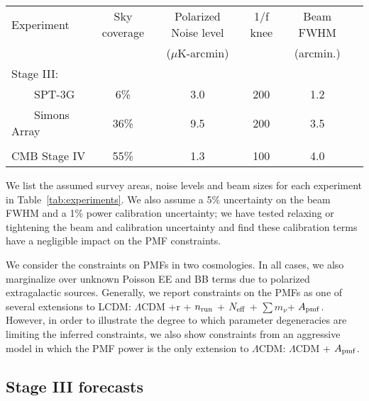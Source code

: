 \documentclass[preprint]{emulateapj}
\newcommand{\apmf}{\ensuremath{A_{\rm pmf}}}
\newcommand{\lcdm}{\ensuremath{\Lambda}CDM}
\newcommand{\nrun}{\ensuremath{n_{\rm run}}}
\newcommand{\neff}{\ensuremath{N_{\rm eff}}}
\newcommand{\mnu}{\ensuremath{\sum m_\nu}}
\begin{document}
\begin{table*}[h]
\begin{center}
\caption{\label{tab:experiments} Assumed survey parameters}
\small
\begin{tabular}{l || c c c c c }
Experiment & Sky coverage & Polarized Noise level  & 1/f knee & Beam FWHM \\
& &($\mu$K-arcmin)&&(arcmin.)\\
\hline
Stage III: & & & & \\

~~~~SPT-3G & 6\% & 3.0 & 200 & 1.2 \\
~~~~Simons Array & 36\% & 9.5 & 200 & 3.5 \\ 
\\
CMB Stage IV & 55\% & 1.3 & 100 & 4.0 \\
\end{tabular}
 \normalsize
\end{center}
\end{table*}


We list the assumed survey areas, noise levels and beam sizes for each experiment in Table~\ref{tab:experiments}. 
We also assume a 5\% uncertainty on the beam FWHM and a 1\% power calibration uncertainty; we have tested relaxing or tightening the beam and calibration uncertainty and find these calibration terms have a negligible impact on the PMF constraints. 


We consider the constraints on PMFs in two cosmologies. 
In all cases, we also marginalize over unknown Poisson EE and BB  terms due to polarized extragalactic sources. 
Generally, we report constraints on the PMFs as one of several extensions to LCDM:  \lcdm{}  +r + \nrun{} + \neff{} + \mnu{}+ \apmf. 
However, in order to illustrate the degree to which parameter degeneracies are limiting the inferred constraints,  we also show constraints from an aggressive model in which the PMF power is the only extension to \lcdm{}:  \lcdm{}  + \apmf. 


\subsection{Stage III forecasts}
\end{document}
